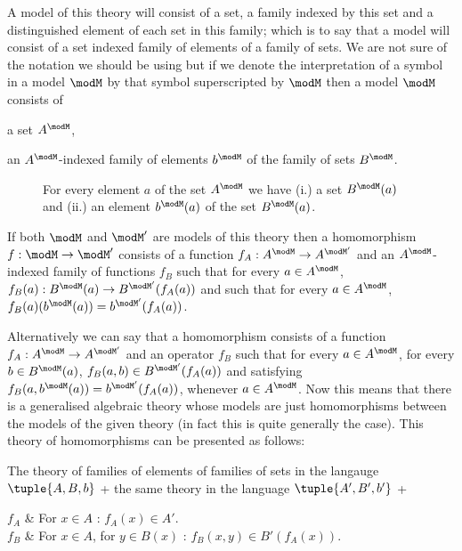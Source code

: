 A model of this theory will consist of a set, a family indexed by this set and a distinguished element of each set in this family; which is to say that a model will consist of a set indexed family of elements of a family of sets.
%
We are not sure of the notation we should be using but if we denote the interpretation of a symbol in a model $\modM$ by that symbol superscripted by $\modM$ then a model $\modM$ consists of 
\begin{enumerate*}[(i.)]
\item a set $A^\modM$,
\item an $A^\modM$-indexed family of elements $b^\modM$ of the family of sets $B^\modM$.
\end{enumerate*}

\begin{figure}
  \caption{For every element $a$ of the set $A^\modM$ we have (i.) a set $B^\modM(a)$ and (ii.) an element $b^\modM(a)$ of the set $B^\modM(a)$.}
\end{figure}


If both $\modM$ and $\modM'$ are models of this theory then a homomorphism $f : \modM \to \modM'$ consists of a function $f_A : A^\modM \to A^{\modM'}$ and an $A^\modM$-indexed family of functions $f_B$ such that for every $a \in A^\modM$, $f_B(a) : B^\modM(a) \to B^{\modM'}(f_A(a))$ and such that for every $a \in A^\modM$, $f_B(a)(b^\modM(a)) = b^{\modM'}(f_A(a))$.

Alternatively we can say that a homomorphism consists of a function $f_A : A^\modM \to A^{\modM'}$ and an operator $f_B$ such that for every $a \in A^\modM$, for every $b \in B^\modM(a)$, $f_B(a,b) \in B^{\modM'}(f_A(a))$ and satisfying $f_B(a,b^\modM(a)) = b^{\modM'}(f_A(a))$, whenever $a \in A^\modM$.
%
Now this means that there is a generalised algebraic theory whose models are just homomorphisms between the models of the given theory (in fact this is quite generally the case).
%
This theory of homomorphisms can be presented as follows:

The theory of families of elements of families of sets in the langauge $\tuple{A,B,b}$ + the same theory in the language $\tuple{A',B',b'}$ + \\
\begin{theoryspec}
  $f_A$ & For $x \in A$ : $f_A(x) \in A'$. \\
  $f_B$ & For $x \in A$, for $y \in B(x)$ : $f_B(x,y) \in B'(f_A(x))$. \\
  \oneaxiom
\end{theoryspec}

